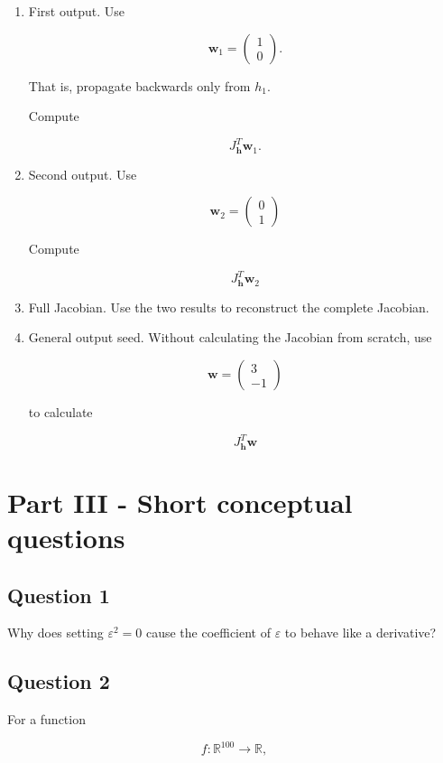 \documentclass{course_sheet}
\begin{document}
\begin{enumerate}
\item
First output. Use

\[
\mathbf w_1 = \begin{pmatrix}1\\0\end{pmatrix}.
\]

That is, propagate backwards only from $h_1$.

Compute

\[
J_{\mathbf h}^T\mathbf w_1.
\]

\item
Second output. Use

\[
\mathbf w_2 = \begin{pmatrix}0\\1\end{pmatrix}
\]

Compute

\[
J_{\mathbf h}^T\mathbf w_2
\]

\item
Full Jacobian. Use the two results to reconstruct the complete Jacobian.

\item
General output seed. Without calculating the Jacobian from scratch, use

\[
\mathbf w = \begin{pmatrix}3\\-1\end{pmatrix}
\]

to calculate

\[
J_{\mathbf h}^T\mathbf w
\]

\end{enumerate}
\clearpage
\section*{Part III - Short conceptual questions}
\subsection*{Question 1}
Why does setting $\varepsilon^2=0$ cause the coefficient of $\varepsilon$ to behave like a derivative?

\subsection*{Question 2}
For a function

\[
f:\mathbb R^{100}\to\mathbb R,
\]
\end{document}
